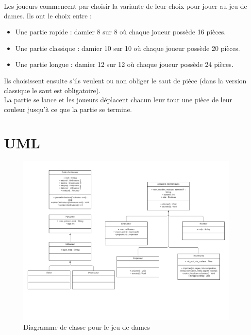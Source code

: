 \documentclass[12,french]{report}
\begin{document}
Les joueurs commencent par choisir la variante de leur choix pour jouer au jeu de dames. Ils ont le choix entre :

\begin{itemize}[label=\textbullet]
	\item Une partie rapide : damier 8 sur 8 où chaque joueur possède 16 pièces.
	\item Une partie classique : damier 10 sur 10 où chaque joueur possède 20 pièces.
	\item Une partie longue : damier 12 sur 12 où chaque joueur possède 24 pièces.
\end{itemize}\vspace{0.3cm}

Ils choisissent ensuite s'ils veulent ou non obliger le saut de pièce (dans la version classique le saut est obligatoire).\\

La partie se lance et les joueurs déplacent chacun leur tour une pièce de leur couleur jusqu'à ce que la partie se termine.


\section{UML}

\begin{figure}[H]
	\center
	\includegraphics[width=1\textwidth]{./Images/UML}
	\caption{Diagramme de classe pour le jeu de dames}
\end{figure}\vspace{0.2cm}
\end{document}
